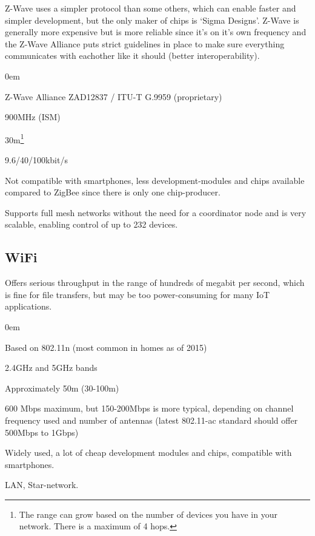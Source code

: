 \documentclass[11pt,a4paper,twoside]{article} %
\begin{document}
Z-Wave uses a simpler protocol than some others, which can enable faster and simpler development, but the only maker of chips is `Sigma Designs'. Z-Wave is generally more expensive but is more reliable since it's on it's own frequency and the Z-Wave Alliance puts strict guidelines in place to make sure everything communicates with eachother like it should (better interoperability).
\vspace{-0.5cm}
\begin{description}
	\itemsep0em
	\item [Standard] Z-Wave Alliance ZAD12837 / ITU-T G.9959 (proprietary)
	\item [Frequency] 900MHz (ISM)
	\item [Range] 30m\footnote{The range can grow based on the number of devices you have in your network. There is a maximum of 4 hops.}
	\item [Bitrate] 9.6/40/100kbit/s 
	\item [Power Usage]
	\item [Infrastructure] Not compatible with smartphones, less development-modules and chips available compared to ZigBee since there is only one chip-producer.
	\item [Network topology] Supports full mesh networks without the need for a coordinator node and is very scalable, enabling control of up to 232 devices. 
\end{description}


\subsection{WiFi}
Offers serious throughput in the range of hundreds of megabit per second, which is fine for file transfers, but may be too power-consuming for many IoT applications. 
\vspace{-0.5cm}
\begin{description}
	\itemsep0em
	\item [Standard] Based on 802.11n (most common in homes as of 2015)
	\item [Frequency] 2.4GHz and 5GHz bands
	\item [Range] Approximately 50m (30-100m)
	\item [Bitrate] 600 Mbps maximum, but 150-200Mbps is more typical, depending on channel frequency used and number of antennas (latest 802.11-ac standard should offer 500Mbps to 1Gbps) 
	\item [Power Usage]
	\item [Infrastructure] Widely used, a lot of cheap development modules and chips, compatible with smartphones.
	\item [Network topology] LAN, Star-network.
\end{description}
\end{document}
